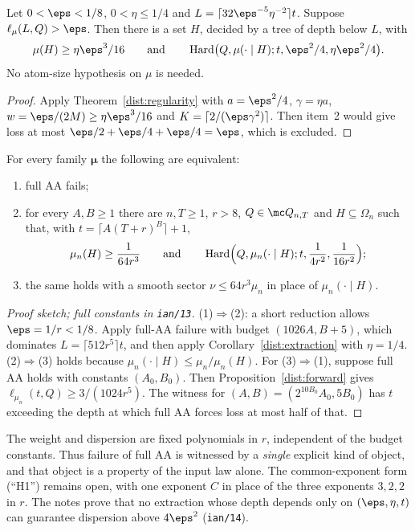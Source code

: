 \begin{corollary}\label{dist:extraction}
Let \(0<\eps<1/8\), \(0<\eta\le1/4\) and
\(L=\lceil32\eps^{-5}\eta^{-2}\rceil t\). Suppose \(\ell_\mu(L,Q)>\eps\). Then
there is a set \(H\), decided by a tree of depth below \(L\), with
\[
 \mu(H)\ge\eta\eps^3/16
 \qquad\text{and}\qquad
 \Hard\bigl(Q,\mu(\cdot\mid H);t,\eps^2/4,\eta\eps^2/4\bigr).
\]
No atom-size hypothesis on \(\mu\) is needed.
\end{corollary}
\begin{proof}
Apply Theorem~\ref{dist:regularity} with \(a=\eps^2/4\), \(\gamma=\eta a\),
\(w=\eps/(2M)\ge\eta\eps^3/16\) and \(K=\lceil2/(\eps\gamma^2)\rceil\). Then
item~2 would give loss at most \(\eps/2+\eps/4+\eps/4=\eps\), which is excluded.
\end{proof}

\begin{theorem}\label{dist:equivalence}
For every family \(\boldsymbol\mu\) the following are equivalent:
\begin{enumerate}
\item full AA fails;
\item for every \(A,B\ge1\) there are \(n,T\ge1\), \(r>8\),
\(Q\in\mc Q_{n,T}\) and \(H\subseteq\Omega_n\) such that, with
\(t=\lceil A(T+r)^B\rceil+1\),
\[
 \mu_n(H)\ge\frac1{64r^3}
 \qquad\text{and}\qquad
 \operatorname{Hard}\Bigl(Q,\mu_n(\cdot\mid H);t,\frac1{4r^2},\frac1{16r^2}\Bigr);
\]
\item the same holds with a smooth sector \(\nu\le64r^3\mu_n\) in place of
\(\mu_n(\cdot\mid H)\).
\end{enumerate}
\end{theorem}
\begin{proof}[Proof sketch; full constants in \texttt{ian/13}]
(1)\(\Rightarrow\)(2): a short reduction allows \(\eps=1/r<1/8\). Apply full-AA
failure with budget \((1026A,B+5)\), which dominates
\(L=\lceil512r^5\rceil t\), and then apply Corollary~\ref{dist:extraction} with
\(\eta=1/4\). (2)\(\Rightarrow\)(3) holds because
\(\mu_n(\cdot\mid H)\le\mu_n/\mu_n(H)\). For (3)\(\Rightarrow\)(1), suppose full
AA holds with constants \((A_0,B_0)\). Then
Proposition~\ref{dist:forward} gives \(\ell_{\mu_n}(t,Q)\ge3/(1024r^5)\). The
witness for \((A,B)=(2^{10B_0}A_0,5B_0)\) has \(t\) exceeding the depth at which
full AA forces loss at most half of that.
\end{proof}
The weight and dispersion are fixed polynomials in \(r\), independent of the
budget constants. Thus failure of full AA is witnessed by a \emph{single}
explicit kind of object, and that object is a property of the input law alone.
The common-exponent form (``H1'') remains open, with one exponent \(C\) in place
of the three exponents \(3,2,2\) in \(r\). The notes prove that no extraction
whose depth depends only on \((\eps,\eta,t)\) can guarantee dispersion above
\(4\eps^2\) (\texttt{ian/14}).

